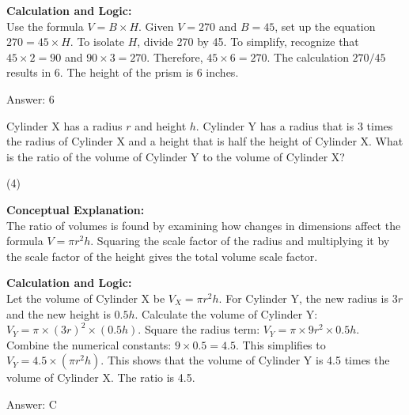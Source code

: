 \documentclass[11pt,paper=a4,answers]{exam}
\begin{document}
\begin{questions}
\begin{solution}
\textbf{Calculation and Logic:} \\
Use the formula $V = B \times H$. Given $V = 270$ and $B = 45$, set up the equation $270 = 45 \times H$. To isolate $H$, divide 270 by 45. To simplify, recognize that $45 \times 2 = 90$ and $90 \times 3 = 270$. Therefore, $45 \times 6 = 270$. The calculation $270 / 45$ results in 6. The height of the prism is 6 inches.

\vspace{30pt}

Answer: \colorbox{yellow!100}{6}
\end{solution}

\vspace{60pt}

\question
Cylinder X has a radius $r$ and height $h$. Cylinder Y has a radius that is 3 times the radius of Cylinder X and a height that is half the height of Cylinder X. What is the ratio of the volume of Cylinder Y to the volume of Cylinder X?
\begin{tasks}(4)
\end{tasks}

\begin{solution}
\textbf{Conceptual Explanation:} \\
The ratio of volumes is found by examining how changes in dimensions affect the formula $V = \pi r^2 h$. Squaring the scale factor of the radius and multiplying it by the scale factor of the height gives the total volume scale factor.

\vspace{30pt}

\textbf{Calculation and Logic:} \\
Let the volume of Cylinder X be $V_X = \pi r^2 h$. For Cylinder Y, the new radius is $3r$ and the new height is $0.5h$. Calculate the volume of Cylinder Y: $V_Y = \pi \times (3r)^2 \times (0.5h)$. Square the radius term: $V_Y = \pi \times 9r^2 \times 0.5h$. Combine the numerical constants: $9 \times 0.5 = 4.5$. This simplifies to $V_Y = 4.5 \times (\pi r^2 h)$. This shows that the volume of Cylinder Y is 4.5 times the volume of Cylinder X. The ratio is 4.5.

\vspace{30pt}

Answer: \colorbox{yellow!100}{C}
\end{solution}

\vspace{60pt}


\end{questions}
\end{document}
